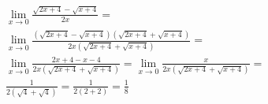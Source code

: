\begin{ex}
\begin{align}
&\lim_{x\rightarrow 0} \frac{\sqrt{2x+4}-\sqrt{x+4}}{2x}=\nonumber\\
&\lim_{x\rightarrow 0} \frac{(\sqrt{2x+4}-\sqrt{x+4})(\sqrt{2x+4}+\sqrt{x+4})}{2x(\sqrt{2x+4}+\sqrt{x+4})}=\nonumber\\
&\lim_{x\rightarrow 0} \frac{2x+4-x-4}{2x(\sqrt{2x+4}+\sqrt{x+4})}=\lim_{x\rightarrow 0} \frac{x}{2x(\sqrt{2x+4}+\sqrt{x+4})}=\nonumber\\
&\frac{1}{2(\sqrt{4}+\sqrt{4})}=\frac{1}{2(2+2)}=\frac{1}{8}\nonumber
\end{align}
\end{ex}
